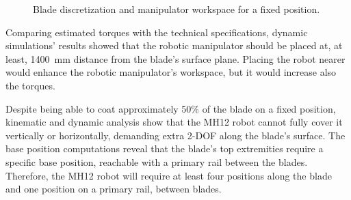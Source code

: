 \begin{figure}
	\centering
	\quad
	\caption{Blade discretization and manipulator workspace for a fixed
	position.}
\end{figure}

Comparing estimated torques with the technical specifications, dynamic
simulations' results showed that the robotic manipulator should be placed at,
at least, 1400~mm distance from the blade's surface plane. Placing the robot
nearer would enhance the robotic manipulator's workspace, but it would increase
also the torques. 

Despite being able to coat approximately 50\% of the blade on a fixed
position, kinematic and dynamic analysis show that the MH12 robot cannot fully
cover it vertically or horizontally, demanding extra 2-DOF along the blade's
surface. The base position computations reveal that the blade's top
extremities require a specific base position, reachable
with a primary rail between the blades. Therefore, the MH12 robot will require
at least four positions along the blade and one position on a primary
rail, between blades. 

